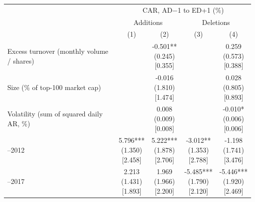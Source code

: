 \begin{threeparttable}
\begingroup
\renewcommand\cellalign{t}
\renewcommand\arraystretch{1}
\setlength{\tabcolsep}{5pt}
\begin{tabular}{@{}lcccc}
\toprule
 & \multicolumn{4}{c}{CAR, AD$-$1 to ED+1 (\%)} \\
\cmidrule(lr){2-5}
 & \multicolumn{2}{c}{Additions} & \multicolumn{2}{c}{Deletions} \\
\cmidrule(lr){2-3} \cmidrule(lr){4-5}
 & (1) & (2) & (3) & (4) \\
\midrule
\addlinespace[1ex]
Excess turnover (monthly volume / shares) &  & \makecell{-0.501** \\ (0.245) \\{}[0.355]} &  & \makecell{0.259 \\ (0.573) \\{}[0.388]} \\
\addlinespace[0.25ex]
\addlinespace[0.25ex]
Size (\% of top-100 market cap) &  & \makecell{-0.016 \\ (1.810) \\{}[1.474]} &  & \makecell{0.028 \\ (0.805) \\{}[0.893]} \\
\addlinespace[0.25ex]
\addlinespace[0.25ex]
Volatility (sum of squared daily AR, \%) &  & \makecell{0.008 \\ (0.009) \\{}[0.008]} &  & \makecell{-0.010* \\ (0.006) \\{}[0.006]} \\
\addlinespace[0.25ex]
\addlinespace[0.25ex]
2007–2012 & \makecell{5.796*** \\ (1.350) \\{}[2.458]} & \makecell{5.222*** \\ (1.878) \\{}[2.706]} & \makecell{-3.012** \\ (1.353) \\{}[2.788]} & \makecell{-1.198 \\ (1.741) \\{}[3.476]} \\
\addlinespace[0.25ex]
\addlinespace[0.25ex]
2013–2017 & \makecell{2.213 \\ (1.431) \\{}[1.893]} & \makecell{1.969 \\ (1.966) \\{}[2.200]} & \makecell{-5.485*** \\ (1.790) \\{}[2.120]} & \makecell{-5.446*** \\ (1.920) \\{}[2.469]} \\

\end{tabular}
\end{threeparttable}
